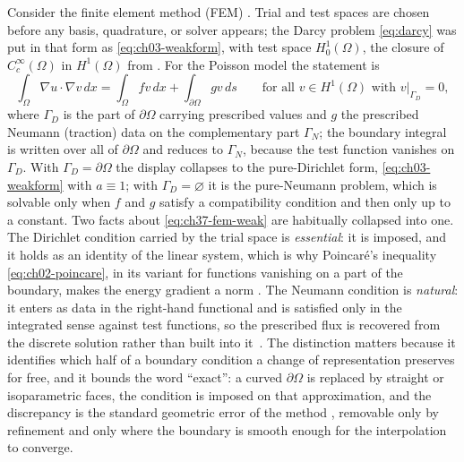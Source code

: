 Consider the finite element method (FEM)
.
Trial and test spaces are chosen before any basis, quadrature, or solver appears; the Darcy problem
\eqref{eq:darcy} was put in that form as \eqref{eq:ch03-weakform}, with test space $H^1_0(\Omega)$,
the closure of $C_c^{\infty}(\Omega)$ in $H^1(\Omega)$ from
. For the Poisson model the statement
is
\begin{equation}
  \label{eq:ch37-fem-weak}
  \int_\Omega \nabla u \cdot \nabla v \, dx = \int_\Omega f v \, dx + \int_{\partial\Omega} g v \, ds
  \qquad \text{for all } v \in H^1(\Omega) \text{ with } v|_{\Gamma_D}=0,
\end{equation}
where $\Gamma_D$ is the part of $\partial\Omega$ carrying prescribed values and $g$ the prescribed
Neumann (traction) data on the complementary part $\Gamma_N$; the boundary integral is written over
all of $\partial\Omega$ and reduces to $\Gamma_N$, because the test function vanishes on $\Gamma_D$.
With $\Gamma_D=\partial\Omega$ the display collapses to the pure-Dirichlet form,
\eqref{eq:ch03-weakform} with $a\equiv1$; with $\Gamma_D=\varnothing$ it is the pure-Neumann
problem, which is
solvable only when $f$ and $g$ satisfy a compatibility condition and then only up to a constant.
Two facts about
\eqref{eq:ch37-fem-weak} are habitually collapsed into one. The Dirichlet condition carried by the
trial space is \emph{essential}: it is imposed, and it holds as an identity of the linear system,
which is why Poincar\'e's inequality \eqref{eq:ch02-poincare}, in its variant for functions
vanishing on a part of the boundary, makes the energy gradient a
norm . The Neumann condition is \emph{natural}: it
enters as data in the right-hand functional and is satisfied only in the integrated sense against
test functions, so the prescribed flux is recovered from the discrete solution rather than built
into it~\cite{evans2010partial,quarteroni2008numerical}. The distinction matters because it
identifies which half of a boundary condition a change of representation preserves for free, and it
bounds the word ``exact'': a curved $\partial\Omega$ is replaced by straight or isoparametric
faces, the condition is imposed on that approximation, and the discrepancy is the standard geometric
error of the method , removable
only by refinement and only where the boundary is smooth enough for the interpolation to converge.

